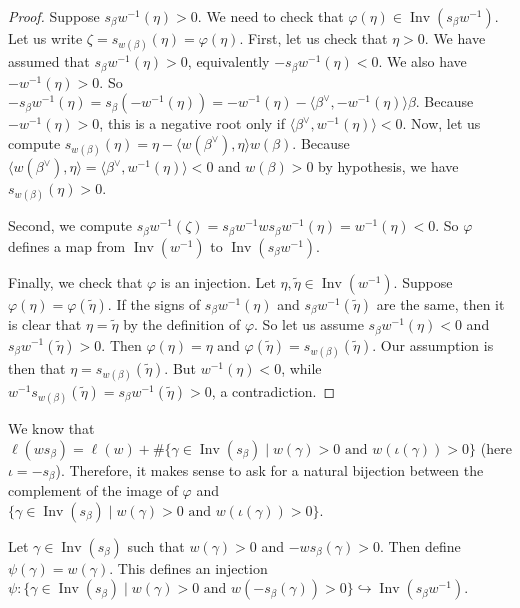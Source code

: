 \documentclass[ALCO,ThmDefs,Unicode]{cedram}
\DeclareMathOperator{\Inv}{Inv}
\newcommand{\betacheck}{\beta^\vee}
\newcommand{\suchthat}{\mid}
\newcommand{\textand}{\text{ and }}
\begin{document}
\begin{proof}
Suppose $s_\beta w^{-1}(\eta)>0$. We need to check that $\varphi(\eta) \in \Inv(s_\beta w^{-1})$. Let us write $\zeta = s_{w(\beta)}(\eta) = \varphi(\eta)$. First, let us check that $\eta > 0$. We have assumed that $s_\beta w^{-1}(\eta) > 0$, equivalently $-s_\beta w^{-1}(\eta) < 0$. We also have $-w^{-1}(\eta) > 0$. So $-s_\beta w^{-1}(\eta) = s_\beta(- w^{-1}(\eta)) = - w^{-1}(\eta) - \langle \betacheck, - w^{-1}(\eta) \rangle \beta $. Because $-w^{-1}(\eta) > 0$, this is a negative root only if $\langle \betacheck, w^{-1}(\eta) \rangle < 0$. Now, let us compute $s_{w(\beta)}(\eta) = \eta - \langle w(\betacheck), \eta \rangle w(\beta)$. Because $\langle w(\betacheck), \eta \rangle = \langle \betacheck, w^{-1}(\eta) \rangle < 0$ and $w(\beta)>0$ by hypothesis, we have $s_{w(\beta)}(\eta) > 0$.

Second, we compute $s_\beta w^{-1}(\zeta) = s_\beta w^{-1} w s_\beta w^{-1} (\eta) = w^{-1} (\eta) < 0$. So $\varphi$ defines a map from $\Inv(w^{-1})$ to $\Inv(s_\beta w^{-1})$.

Finally, we check that $\varphi$ is an injection. Let $\eta, \widetilde{\eta} \in \Inv(w^{-1})$. Suppose $\varphi(\eta) = \varphi(\widetilde{\eta})$. If the signs of $s_\beta w^{-1}(\eta)$ and $s_\beta w^{-1}(\widetilde{\eta})$ are the same, then it is clear that $\eta = \widetilde{\eta}$ by the definition of $\varphi$. So let us assume $s_\beta w^{-1}(\eta) < 0$ and $s_\beta w^{-1}(\widetilde{\eta}) > 0$. Then $\varphi(\eta) = \eta$ and $\varphi(\widetilde{\eta}) = s_{w(\beta)}(\widetilde{\eta})$. Our assumption is then that $\eta = s_{w(\beta)}(\widetilde{\eta})$. But $w^{-1}(\eta) < 0$, while $w^{-1}s_{w(\beta)}(\widetilde{\eta}) = s_{\beta}w^{-1}(\widetilde{\eta}) > 0$, a contradiction.
\end{proof}

We know that $\ell(ws_\beta) = \ell(w) + \# \{ \gamma \in \Inv(s_\beta) \suchthat w(\gamma) > 0 \textand w(\iota(\gamma)) > 0 \}$ (here $\iota = - s_\beta$). Therefore, it makes sense to ask for a natural bijection between the complement of the image of $\varphi$ and $\{ \gamma \in \Inv(s_\beta) \suchthat w(\gamma) > 0 \textand w(\iota(\gamma)) > 0 \}$.

\begin{prop}\label{prop-psi-is-an-injection}
Let $\gamma \in \Inv(s_\beta)$ such that $w(\gamma) > 0$ and $- w s_\beta (\gamma) > 0$. Then define $\psi(\gamma) = w(\gamma)$. This defines an injection $\psi :\{ \gamma \in \Inv(s_\beta) \suchthat w(\gamma) > 0 \textand w(-s_\beta(\gamma)) > 0 \} \hookrightarrow \Inv(s_\beta w^{-1})$.
\end{prop}
\end{document}
